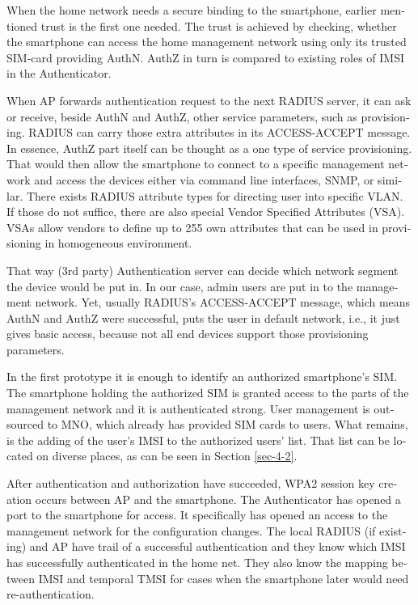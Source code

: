 \documentclass[12pt,a4paper,english]{tutthesis}
\begin{document}
\begin{otherlanguage}{english}
When the home network needs a secure binding to the smartphone, earlier
mentioned trust is the first one needed.  The trust is achieved by
checking, whether the smartphone can access the home management
network using only its trusted SIM-card providing AuthN. AuthZ in
turn is compared to existing roles of IMSI in the Authenticator.




When AP forwards authentication request to the next RADIUS server, it
can ask or receive, beside AuthN and AuthZ, other service parameters,
such as provisioning. RADIUS can carry those extra attributes in its
ACCESS-ACCEPT message.  In essence, AuthZ part itself can be thought
as a one type of service provisioning.  That would then allow the
smartphone to connect to a specific management network and access the
devices either via command line interfaces, SNMP, or
similar\cite[p.4]{rfc5608}.
There exists RADIUS attribute types for directing user into specific
VLAN. If those do not suffice, there are also special Vendor Specified
Attributes (VSA). VSAs allow vendors to define up to 255 own
attributes that can be used in provisioning in homogeneous environment. 


That way (3rd party) Authentication server can decide which network
segment the device would be put in.  In our case, admin users are put in
to the management network.  Yet, usually RADIUS's ACCESS-ACCEPT message,
which means AuthN and AuthZ were successful,  puts the user in
default network, i.e., it just gives basic access, because 
not all end devices support those provisioning parameters.

In the first prototype it is enough to identify an authorized
smartphone's SIM.  The smartphone holding the authorized SIM is granted access to
the parts of the management network and it is authenticated strong.  User
management is outsourced to MNO, which
already has provided SIM cards to users. What remains, is the adding
of the user's IMSI to the authorized users' list. That list can be
located on diverse places, as can be seen in Section \ref{sec-4-2}.


After authentication and authorization have succeeded, WPA2 session key
creation occurs between AP and the smartphone. 
The Authenticator has opened a port to the smartphone for
access. It specifically has opened an access to the management network for
the configuration changes. 
The local RADIUS (if existing) and AP have trail of a successful
authentication and they know which IMSI has successfully authenticated in
the home net. They also know the mapping between IMSI and temporal TMSI for
cases when the smartphone later would need re-authentication.



\end{otherlanguage}
\end{document}
